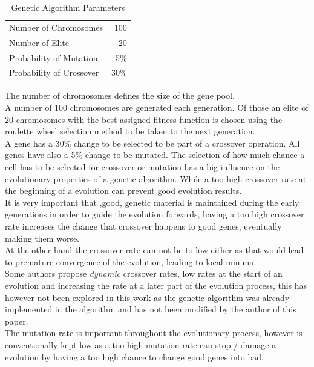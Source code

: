 \begin{table}[h]
\begin{center}
\begin{tabular}{l r}
Number of Chromosomes & 100 \\
Number of Elite & 20\\
Probability of Mutation & 5\%\\
Probability of Crossover & 30\%\\
\end{tabular}
\caption{Genetic Algorithm Parameters}
\end{center}
\end{table}

The number of chromosomes defines the size of the gene pool. \\
A number of 100 chromosomes are generated each generation. Of those an elite of 20 chromosomes with the best assigned fitness function is chosen using the roulette wheel selection method to be taken to the next generation.\\
A gene has a 30\% change to be selected to be part of a crossover operation.
All genes have also a 5\% change to be mutated. 
The selection of how much chance a cell has to be selected for crossover or mutation has a big influence on the evolutionary properties of a genetic algorithm. While a too high crossover rate at the beginning of a evolution can prevent good evolution results.\\
It is very important that ,good, genetic material is maintained during the early generations in order to guide the evolution forwards, having a too high crossover rate  increases the change that crossover happens to good genes, eventually making them worse.\\
At the other hand the crossover rate can not be to low either as that would lead to premature convergence of the evolution, leading to local minima. \\
Some authors propose \textit{dynamic} crossover rates, low rates at the start of an evolution and increasing the rate at a later part of the evolution process, this has however not been explored in this work as the genetic algorithm was already implemented in the algorithm and has not been modified by the author of this paper.\\
The mutation rate is important throughout the evolutionary process, however is conventionally kept low as a too high mutation rate can stop / damage a evolution by having a too high chance to change good genes into bad.

